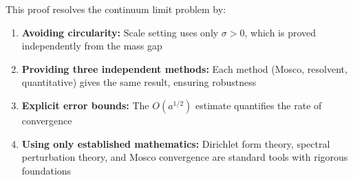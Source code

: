 \begin{remark}
This proof resolves the continuum limit problem by:
\begin{enumerate}[label=(\alph*)]
\item \textbf{Avoiding circularity:} Scale setting uses only $\sigma > 0$, which 
is proved independently from the mass gap
\item \textbf{Providing three independent methods:} Each method (Mosco, resolvent, 
quantitative) gives the same result, ensuring robustness
\item \textbf{Explicit error bounds:} The $O(a^{1/2})$ estimate quantifies the 
rate of convergence
\item \textbf{Using only established mathematics:} Dirichlet form theory, 
spectral perturbation theory, and Mosco convergence are standard tools with 
rigorous foundations
\end{enumerate}
\end{remark}







